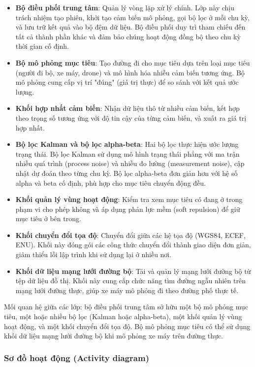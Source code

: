 \begin{itemize}
\item \textbf{Bộ điều phối trung tâm}: Quản lý vòng lặp xử lý chính. Lớp này chịu trách nhiệm tạo phiên, khởi tạo cảm biến mô phỏng, gọi bộ lọc ở mỗi chu kỳ, và lưu trữ kết quả vào bộ đệm dữ liệu. Bộ điều phối duy trì tham chiếu đến tất cả thành phần khác và đảm bảo chúng hoạt động đồng bộ theo chu kỳ thời gian cố định.
    \item \textbf{Bộ mô phỏng mục tiêu}: Tạo đường đi cho mục tiêu dựa trên loại mục tiêu (người đi bộ, xe máy, drone) và mô hình hóa nhiễu cảm biến tương ứng. Bộ mô phỏng cung cấp vị trí "đúng" (giá trị thực) để so sánh với kết quả ước lượng.
    \item \textbf{Khối hợp nhất cảm biến}: Nhận dữ liệu thô từ nhiều cảm biến, kết hợp theo trọng số tương ứng với độ tin cậy của từng cảm biến, và xuất ra giá trị hợp nhất.
    \item \textbf{Bộ lọc Kalman và bộ lọc alpha-beta}: Hai bộ lọc thực hiện ước lượng trạng thái. Bộ lọc Kalman sử dụng mô hình trạng thái phẳng với ma trận nhiễu quá trình (process noise) và nhiễu đo lường (measurement noise), cập nhật dự đoán theo từng chu kỳ. Bộ lọc alpha-beta đơn giản hơn với hệ số alpha và beta cố định, phù hợp cho mục tiêu chuyển động đều.
    \item \textbf{Khối quản lý vùng hoạt động}: Kiểm tra xem mục tiêu có đang ở trong phạm vi cho phép không và áp dụng phản lực mềm (soft repulsion) để giữ mục tiêu ở bên trong.
    \item \textbf{Khối chuyển đổi tọa độ}: Chuyển đổi giữa các hệ tọa độ (WGS84, ECEF, ENU). Khối này đóng gói các công thức chuyển đổi thành giao diện đơn giản, giảm thiểu lỗi lập trình khi sử dụng lại ở nhiều nơi.
    \item \textbf{Khối dữ liệu mạng lưới đường bộ}: Tải và quản lý mạng lưới đường bộ từ tệp dữ liệu đồ thị. Khối này cung cấp chức năng tìm đường ngẫu nhiên trên mạng lưới đường thực, giúp xe máy mô phỏng đi theo đường phố thực tế.
\end{itemize}

Mối quan hệ giữa các lớp: bộ điều phối trung tâm sở hữu một bộ mô phỏng mục tiêu, một hoặc nhiều bộ lọc (Kalman hoặc alpha-beta), một khối quản lý vùng hoạt động, và một khối chuyển đổi tọa độ. Bộ mô phỏng mục tiêu có thể sử dụng khối dữ liệu mạng lưới đường bộ khi mô phỏng xe máy trên đường thực.

\subsubsection{Sơ đồ hoạt động (Activity diagram)}

